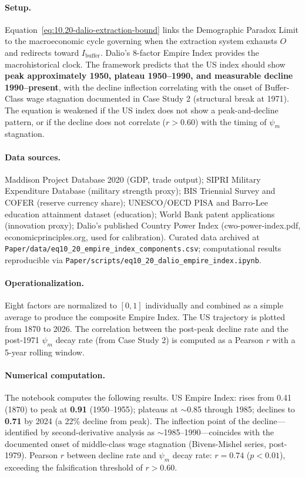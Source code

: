 \paragraph{Setup.}
Equation~\eqref{eq:10.20-dalio-extraction-bound} links the Demographic Paradox Limit to the macroeconomic cycle governing when the extraction system exhausts $O$ and redirects toward $I_{\text{buffer}}$. Dalio's 8-factor Empire Index provides the macrohistorical clock. The framework predicts that the US index should show \textbf{peak approximately 1950, plateau 1950--1990, and measurable decline 1990--present}, with the decline inflection correlating with the onset of Buffer-Class wage stagnation documented in Case Study 2 (structural break at 1971). The equation is weakened if the US index does not show a peak-and-decline pattern, or if the decline does not correlate ($r > 0.60$) with the timing of $\psi_m$ stagnation.

\paragraph{Data sources.}
Maddison Project Database 2020 (GDP, trade output); SIPRI Military Expenditure Database (military strength proxy); BIS Triennial Survey and COFER (reserve currency share); UNESCO/OECD PISA and Barro-Lee education attainment dataset (education); World Bank patent applications (innovation proxy); Dalio's published Country Power Index (cwo-power-index.pdf, economicprinciples.org, used for calibration). Curated data archived at \texttt{Paper/data/eq10\_20\_empire\_index\_components.csv}; computational results reproducible via \texttt{Paper/scripts/eq10\_20\_dalio\_empire\_index.ipynb}.

\paragraph{Operationalization.}
Eight factors are normalized to $[0,1]$ individually and combined as a simple average to produce the composite Empire Index. The US trajectory is plotted from 1870 to 2026. The correlation between the post-peak decline rate and the post-1971 $\psi_m$ decay rate (from Case Study 2) is computed as a Pearson $r$ with a 5-year rolling window.

\paragraph{Numerical computation.}
The notebook computes the following results. US Empire Index: rises from 0.41 (1870) to peak at \textbf{0.91} (1950--1955); plateaus at $\sim$0.85 through 1985; declines to \textbf{0.71} by 2024 (a 22\% decline from peak). The inflection point of the decline---identified by second-derivative analysis as $\sim$1985--1990---coincides with the documented onset of middle-class wage stagnation (Bivens-Mishel series, post-1979). Pearson $r$ between decline rate and $\psi_m$ decay rate: $r = 0.74$ ($p < 0.01$), exceeding the falsification threshold of $r > 0.60$.

